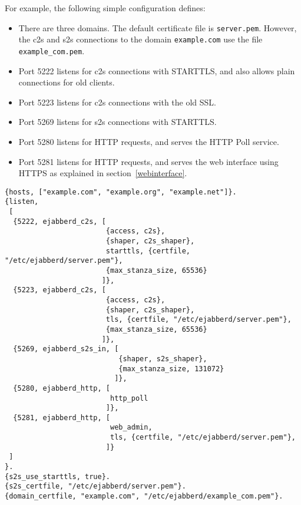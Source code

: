 \documentclass[a4paper,10pt]{book}
\newcommand{\term}[1]{\texttt{#1}}
\begin{document}
For example, the following simple configuration defines:
\begin{itemize}
\item There are three domains. The default certificate file is \term{server.pem}.
However, the c2s and s2s connections to the domain \term{example.com} use the file \term{example\_com.pem}.
\item Port 5222 listens for c2s connections with STARTTLS, 
  and also allows plain connections for old clients.
\item Port 5223 listens for c2s connections with the old SSL.
\item Port 5269 listens for s2s connections with STARTTLS.
\item Port 5280 listens for HTTP requests, and serves the HTTP Poll service.
\item Port 5281 listens for HTTP requests, and serves the web interface using HTTPS as explained in
  section~\ref{webinterface}.
\end{itemize}
\begin{verbatim}
{hosts, ["example.com", "example.org", "example.net"]}.
{listen,
 [
  {5222, ejabberd_c2s, [
                        {access, c2s}, 
                        {shaper, c2s_shaper},
                        starttls, {certfile, "/etc/ejabberd/server.pem"},
                        {max_stanza_size, 65536}
                       ]},
  {5223, ejabberd_c2s, [
                        {access, c2s},
                        {shaper, c2s_shaper},
                        tls, {certfile, "/etc/ejabberd/server.pem"},
                        {max_stanza_size, 65536}
                       ]},
  {5269, ejabberd_s2s_in, [
                           {shaper, s2s_shaper},
                           {max_stanza_size, 131072}
                          ]},
  {5280, ejabberd_http, [
                         http_poll
                        ]},
  {5281, ejabberd_http, [
                         web_admin,
                         tls, {certfile, "/etc/ejabberd/server.pem"},
                        ]}
 ]
}.
{s2s_use_starttls, true}.
{s2s_certfile, "/etc/ejabberd/server.pem"}.
{domain_certfile, "example.com", "/etc/ejabberd/example_com.pem"}.
\end{verbatim}
\end{document}

